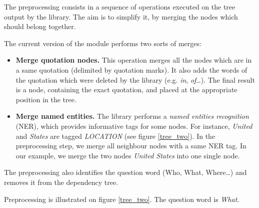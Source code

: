 The preprocessing consists in a sequence of operations executed on the tree output by the \Stanford library. The aim is to simplify it, by merging the nodes which should belong together. %

The current version of the module performs two sorts of merges:
\begin{itemize}
    \item \textbf{Merge quotation nodes.} This operation merges all the nodes which are in a same quotation (delimited by quotation marks). It also adds the words
    of the quotation which were deleted by the \Stanford library (e.g. \emph{in}, \emph{of}\dots). The final result is a node, containing the
    exact quotation, and placed at the appropriate position in the tree.
    
    \item \textbf{Merge named entities.} The \Stanford library performs a \emph{named entities recognition} (NER), which provides informative 
    tags for some nodes. For instance, \emph{United} and \emph{States} are tagged \emph{LOCATION} (see figure \ref{tree_two}). In the preprocessing step, we merge all neighbour nodes with a same NER tag. In our example, we merge the two nodes \emph{United States} into one single node.
\end{itemize}

The preprocessing also identifies the question word (Who, What, Where\dots) and removes it from the dependency tree.

Preprocessing is illustrated on figure \ref{tree_two}. The question word is \textit{What}.

